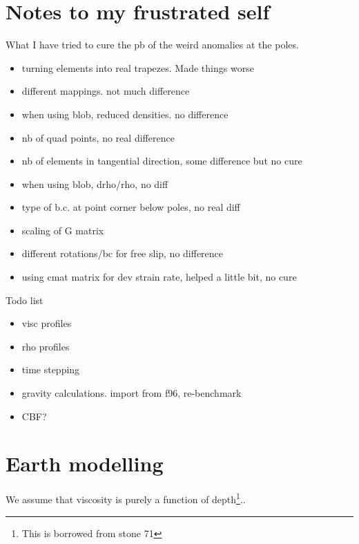 \newpage
\section*{Notes to my frustrated self}

What I have tried to cure the pb of the weird anomalies at the poles.

\begin{itemize}
\item turning elements into real trapezes. Made things worse
\item different mappings. not much difference
\item when using blob, reduced densities. no difference
\item nb of quad points, no real difference
\item nb of elements in tangential direction, some difference but no cure
\item when using blob, drho/rho, no diff
\item type of b.c. at point corner below poles, no real diff
\item scaling of G matrix
\item different rotations/bc for free slip, no difference
\item using cmat matrix for dev strain rate, helped a little bit, no cure
\end{itemize}

Todo list

\begin{itemize}
\item visc profiles
\item rho profiles
\item time stepping
\item gravity calculations. import from f96, re-benchmark
\item CBF?
\end{itemize}


\newpage
\section*{Earth modelling}



We assume that viscosity is purely a function of depth\footnote{This is borrowed 
from stone 71}.. 


